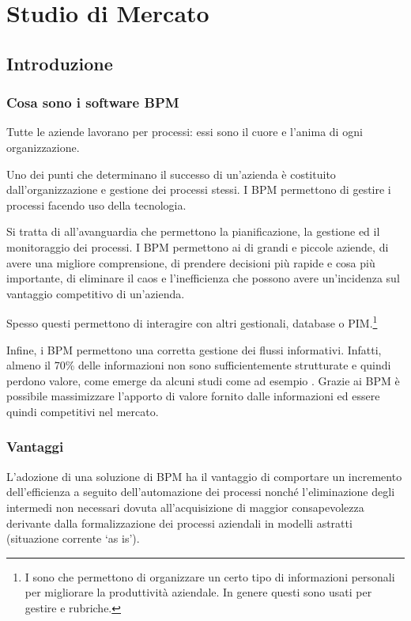 \chapter{Studio di Mercato}
\section{Introduzione}
\subsection{Cosa sono i software BPM}
	
Tutte le aziende lavorano per processi: essi sono il cuore e l'anima di ogni organizzazione.
		
Uno dei punti che determinano il successo di un'azienda è costituito dall'organizzazione e gestione dei processi stessi. I \sw BPM permettono di gestire i processi facendo uso della tecnologia. 
		
Si tratta di \sw all'avanguardia che permettono la pianificazione, la gestione ed il monitoraggio dei processi.
I \sw BPM permettono  ai  di grandi e piccole aziende, di avere una migliore comprensione, di prendere decisioni più rapide e cosa più importante, di eliminare il caos e l'inefficienza che possono avere un'incidenza sul vantaggio competitivo di un'azienda.

Spesso questi \sw permettono di interagire con altri \sw gestionali, database o PIM\@.\footnote{I  sono \sw che permettono di organizzare un certo tipo di informazioni personali per migliorare la produttività aziendale. In genere questi \sw sono usati per gestire  e rubriche.}

Infine, i \sw BPM permettono una corretta gestione dei flussi informativi. Infatti, almeno il 70\% delle informazioni non sono sufficientemente strutturate e quindi perdono valore, come emerge da alcuni studi come ad esempio \cite{mazzolari:bpmita}. Grazie ai \sw BPM è possibile massimizzare l'apporto di valore fornito dalle informazioni ed essere quindi competitivi nel mercato.

\subsection{Vantaggi}
L'adozione di una soluzione di BPM ha il vantaggio di comportare un incremento dell'efficienza a seguito dell'automazione dei processi nonché l'eliminazione degli  intermedi non necessari dovuta all'acquisizione di maggior consapevolezza derivante dalla formalizzazione dei processi aziendali in modelli astratti (situazione corrente `as is').

